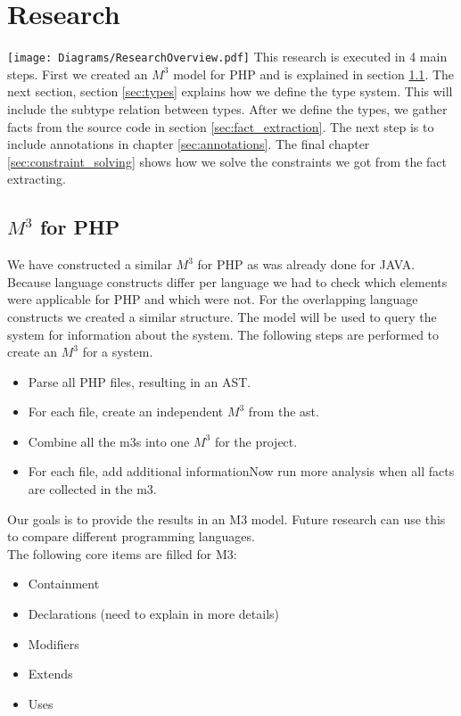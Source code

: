 \documentclass[../main.tex]{subfiles}
\begin{document}
    \chapter{Research}\label{chap:research}

    \texttt{[image: Diagrams/ResearchOverview.pdf]}
    This research is executed in 4 main steps.
    First we created an $M^3$ model for PHP and is explained in section \ref{sec:m3_for_php}.
    The next section, section \ref{sec:types} explains how we define the type system. 
    This will include the subtype relation between types.
    After we define the types, we gather facts from the source code in section \ref{sec:fact_extraction}.
    The next step is to include annotations in chapter \ref{sec:annotations}.
    The final chapter \ref{sec:constraint_solving} shows how we solve the constraints we got from the fact extracting.
    
    \section{$M^3$ for PHP}\label{sec:m3_for_php}
    We have constructed a similar $M^3$ for PHP as was already done for JAVA.
    Because language constructs differ per language we had to check which elements were applicable for PHP and which were not.
    For the overlapping language constructs we created a similar structure.
    The model will be used to query the system for information about the system.
    The following steps are performed to create an $M^3$ for a system.
    \begin{itemize}
        \item Parse all PHP files, resulting in an \gls{AST}.
        \item For each file, create an independent $M^3$ from the ast.
        \item Combine all the m3s into one $M^3$ for the project.
        \item For each file, add additional informationNow run more analysis when all facts are collected in the m3. 
    \end{itemize}

    Our goals is to provide the results in an M3 model.
    Future research can use this to compare different programming languages.
    \\ 
    The following core items are filled for M3:
    \begin{itemize}
        \item Containment
        \item Declarations (need to explain in more details)
        \item Modifiers
        \item Extends
        \item Uses
    \end{itemize}
    
\end{document}
